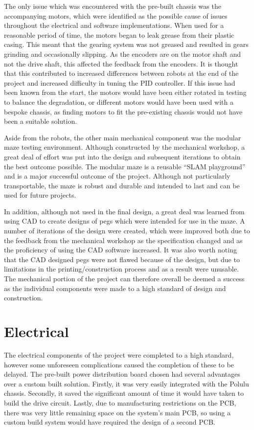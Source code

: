 The only issue which was encountered with the pre-built chassis was the
accompanying motors, which were identified as the possible cause of
issues throughout the electrical and software implementations. When used
for a reasonable period of time, the motors began to leak grease from
their plastic casing. This meant that the gearing system was not greased
and resulted in gears grinding and occasionally slipping. As the
encoders are on the motor shaft and not the drive shaft, this affected
the feedback from the encoders. It is thought that this contributed to
increased differences between robots at the end of the project and
increased difficulty in tuning the PID controller. If this issue
had been known from the start, the motors would have been either rotated
in testing to balance the degradation, or different motors would have
been used with a bespoke chassis, as finding motors to fit the pre-existing
chassis would not have been a suitable solution.

Aside from the robots, the other main mechanical component was the modular maze
testing environment. Although constructed by the mechanical workshop, a great deal of
effort was put into the design and subsequent iterations to obtain the best outcome
possible. The modular maze is a reusable ``SLAM playground'' and is a major
successful outcome of the project. Although not particularly transportable, the maze
is robust and durable and intended to last and can be used for future projects.

In addition, although not used in the final design, a great deal was learned from
using CAD to create designs of pegs which were intended for use in the maze. A number
of iterations of the design were created, which were improved both due to the feedback from the mechanical workshop as the specification changed and as the proficiency of using the CAD software increased. It was also worth noting that the CAD designed pegs were not flawed
because of the design, but due to limitations in the printing/construction process and as a result were unusable.
The mechanical portion of the project can therefore overall be deemed a success as
the individual components were made to a high standard of design and construction.

\section{Electrical}\label{eval/elec}
The electrical components of the project were completed to a high standard,
however some unforeseen complications caused the completion of these to be delayed. The pre-built power distribution board chosen had several advantages over a
custom built solution. Firstly, it was very easily integrated with the Polulu
chassis. Secondly, it saved the significant amount of time it would have taken
to build the drive circuit. Lastly, due to manufacturing restrictions on the PCB,
there was very little remaining space on the system's main PCB, so using a custom
build system would have required the design of a second PCB.

